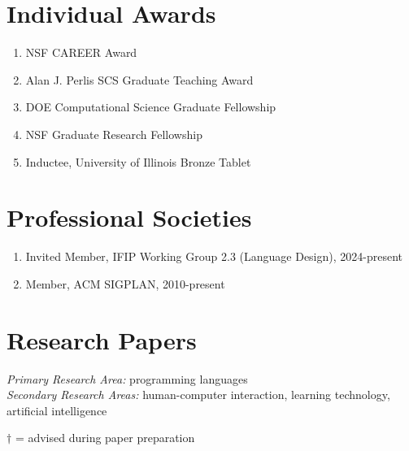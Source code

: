 \documentclass[10pt,letterpaper]{article}
\begin{document}
\section*{Individual Awards}
\begin{enumerate}
  \item NSF CAREER Award
  \item {Alan J. Perlis SCS Graduate Teaching Award}
  \item DOE Computational Science Graduate Fellowship
  \item NSF Graduate Research Fellowship
  \item Inductee, University of Illinois Bronze Tablet
\end{enumerate}

\section*{Professional Societies}
\begin{enumerate}
  \item Invited Member, IFIP Working Group 2.3 (Language Design), 2024-present
  \item Member, ACM SIGPLAN, 2010-present
\end{enumerate}

\section*{Research Papers}

\textit{Primary Research Area:} programming languages \\
\textit{Secondary Research Areas:} human-computer interaction, learning technology, artificial intelligence

\newcommand{\advisee}[1]{#1$^\dagger$}
$\dagger$ = advised during paper preparation
\end{document}
